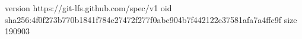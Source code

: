 version https://git-lfs.github.com/spec/v1
oid sha256:4f0f273b770b1841f784e27472f277f0abc904b7f442122e37581afa7a4ffc9f
size 190903
